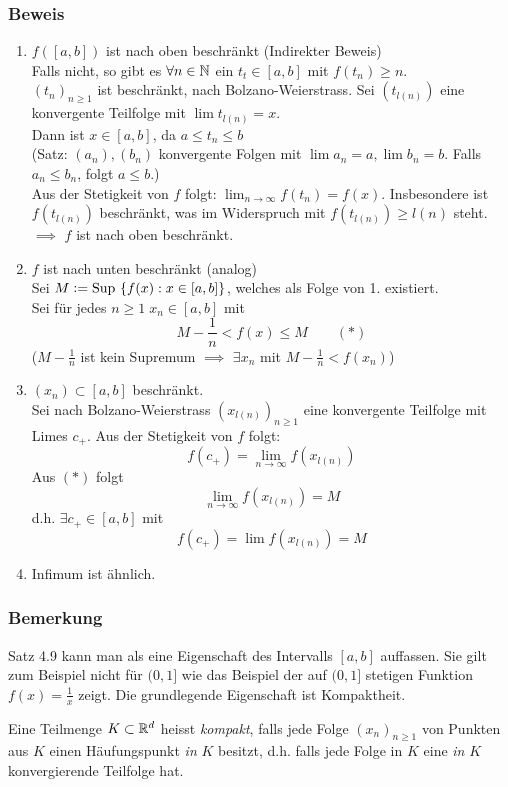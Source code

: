 \subsubsection*{Beweis}
\begin{enumerate}
\item $f([a,b])$ ist nach oben beschränkt (Indirekter Beweis) \\

Falls nicht, so gibt es $\forall n \in \mathbb{N}$ ein $t_{t}\in [a,b]$ mit $f(t_{n}) \geq n$. \\
$(t_{n})_{n\geq 1}$ ist beschränkt, nach Bolzano-Weierstrass. Sei $(t_{l(n)})$ eine konvergente Teilfolge mit $\lim{t_{l(n)}}=x$. \\
Dann ist $x\in [a,b]$, da $a\leq t_{n}\leq b$ \\
(Satz: $(a_{n}), (b_{n})$ konvergente Folgen mit $\lim{a_{n}} = a, \lim{b_{n}} = b$. Falls $a_{n} \leq b_{n}$, folgt $a \leq b$.) \\
Aus der Stetigkeit von $f$ folgt: $\lim_{n\to\infty}{f(t_{n})} = f(x)$. Insbesondere ist $f(t_{l(n)})$ beschränkt, was im Widerspruch mit $f(t_{l(n)})\geq l(n)$ steht. \\

$\implies$ $f$ ist nach oben beschränkt.

\item $f$ ist nach unten beschränkt (analog) \\

Sei $M \vcentcolon= \text{Sup }\{f(x):x\in [a,b]\}$, welches als Folge von 1. existiert. \\
Sei für jedes $n\geq 1\; x_{n}\in [a,b]$ mit \[M-\frac{1}{n} < f(x) \leq M \quad\quad (\ast)\]
($M-\frac{1}{n}$ ist kein Supremum $\implies$ $\exists x_{n}$ mit $M-\frac{1}{n} < f(x_{n})$)\\
\item $(x_{n}) \subset [a,b]$ beschränkt. \\
Sei nach Bolzano-Weierstrass $(x_{l(n)})_{n\geq 1}$ eine konvergente Teilfolge mit Limes $c_{+}$. Aus der Stetigkeit von $f$ folgt: \[ f(c_{+}) = \lim_{n\to\infty}{f(x_{l(n)})}\]
Aus $(\ast)$ folgt
\[ \lim_{n\to\infty}{f(x_{l(n)})} = M\]
d.h. $\exists c_{+} \in [a,b]$ mit \[ f(c_{+}) = \lim{f(x_{l(n)})} = M\]
\item Infimum ist ähnlich.
\end{enumerate}

\subsubsection*{Bemerkung}
Satz 4.9 kann man als eine Eigenschaft des Intervalls $[a,b]$ auffassen. Sie gilt zum Beispiel nicht für $(0,1]$ wie das Beispiel der auf $(0,1]$ stetigen Funktion $f(x)=\frac{1}{x}$ zeigt.
Die grundlegende Eigenschaft ist Kompaktheit.
\begin{definition}{4.10}
Eine Teilmenge $K\subset\mathbb{R}^{d}$ heisst \emph{kompakt}, falls jede Folge $(x_{n})_{n\geq 1}$ von Punkten aus $K$ einen Häufungspunkt \emph{in} $K$ besitzt, d.h. falls jede Folge in $K$ eine \emph{in} $K$ konvergierende Teilfolge hat.
\end{definition}

